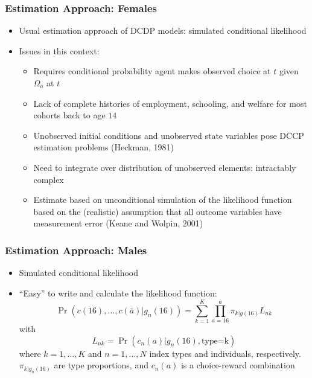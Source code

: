 \begin{frame}
	\frametitle{Estimation Approach: Females}
		\begin{itemize}
			\item Usual estimation approach of DCDP models: simulated conditional likelihood
			\item Issues in this context:
				\begin{itemize}
					\item Requires conditional probability agent makes observed choice at $t$ given $\Omega_{a}$ at $t$
					\item Lack of complete histories of employment, schooling, and welfare for most cohorts back to age $14$
					\item Unobserved initial conditions and unobserved state variables pose DCCP estimation problems (Heckman, 1981)
					\item Need to integrate over distribution of unobserved elements: intractably complex
					\item Estimate based on unconditional simulation of the likelihood function based on the (realistic) assumption that all outcome variables have measurement error (Keane and Wolpin, 2001)
				\end{itemize}							
		\end{itemize}
\end{frame}

\begin{frame}
	\frametitle{Estimation Approach: Males}
		\begin{itemize}
			\item Simulated conditional likelihood
			\item ``Easy'' to write and calculate the likelihood function:
			\begin{equation}
				\Pr \left( c(16), \ldots, c(\bar{a})|g_{n}(16) \right) =
\sum \limits _{k=1} ^K \prod \limits _{a=16} ^{\bar{a}} \pi_{k|g(16)} L_{nk} \nonumber
			\end{equation}
\noindent with
\begin{equation}
L_{nk} = \Pr \left( c_{n}(a) | g_n(16), \text{type=k} \right)	\nonumber 
\end{equation}
\noindent where $k=1,\ldots,K$ and $n = 1, \ldots, N$ index types and individuals, respectively. $\pi_{k|g_{n}(16)}$ are type proportions, and $c_{n}(a)$ is a choice-reward combination
		\end{itemize}
\end{frame}

